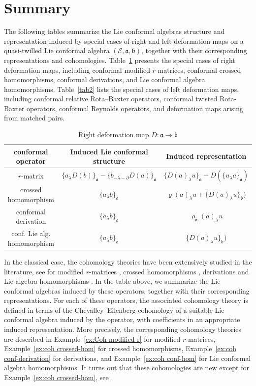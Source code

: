 \documentclass[a4paper,11pt]{article}
\def\Ep{\mathcal{E}}
\def\Vs{\mathfrak{a}}
\def\Ws{\mathfrak{b}}
\def\rep{\varrho}
\def\la{\lambda}
\def\p{\partial}
\numberwithin{equation}{section}
\begin{document}
 \section*{Summary} The following tables summarize the Lie conformal algebras structure and representation  induced by special cases of right and left deformation maps on a quasi-twilled Lie conformal algebra $(\Ep,\Vs,\Ws)$, together with their corresponding representations and cohomologies.
Table~\ref{tab1} presents the special cases of right deformation maps, including conformal modified $r$-matrices, conformal crossed homomorphisms, conformal derivations, and Lie conformal  algebra homomorphisms.
Table~\ref{tab2} lists the special cases of left deformation maps, including conformal relative Rota--Baxter operators, conformal twisted Rota-Baxter operators, conformal Reynolds operators, and deformation maps arising from matched pairs.
\begin{table}[ht]
\centering
\caption{Right deformation map $D:\Vs\to\Ws$}
\label{tab1}
\begin{tabular}{|c|c|c|}
\hline
  conformal operator & Induced Lie conformal  structure&  Induced representation\\
\hline
  $r$-matrix & $\{a_\la D(b)\}_\Vs - \{b_{-\la-\p}D(a)\}_\Vs$&  $\{D(a)_\la u\}_\Vs - D(\{u_\la a\}_\Vs)$\\
 \hline
 crossed homomorphism & $\{a_\la b\}_\Vs $&  $\rep(a)_\la u + \{D(a)_\la u\}_\Ws)$\\
 \hline
 conformal derivation & $\{a_\la b\}_\Vs$&  $\rep_\Vs(a)_\la u $\\
 \hline
 conf. Lie alg. homomorphism & $\{a_\la b\}_\Vs $&  $\{D(a)_\la u\}_\Ws)$\\
 \hline
\end{tabular}
\end{table}

In the classical case, the cohomology theories have been extensively studied in the literature,  see for   modified $r$-matrices \cite{JS2}, crossed homomorphisms \cite{PSTZ}, derivations \cite{TFS} and Lie algebra homomorphisms \cite{Fregier1,Fregier2}. In the table above, we summarize the Lie conformal algebras induced by these operators, together with their corresponding representations. For each of these operators, the associated cohomology theory is defined in terms of the Chevalley--Eilenberg cohomology of a suitable Lie conformal algebra induced by the operator, with coefficients in an appropriate induced representation. More precisely, the corresponding cohomology theories are described in Example~\ref{ex:Coh modified-r} for modified $r$-matrices, Example~\ref{ex:coh crossed-hom} for crossed homomorphisms, Example~\ref{ex:coh conf-derivation} for derivations, and Example~\ref{ex:coh conf-hom} for Lie conformal algebra homomorphisms. It turns out that these cohomologies are new except for 
Example~\ref{ex:coh crossed-hom}, see \cite{BBSS}.
\end{document}
